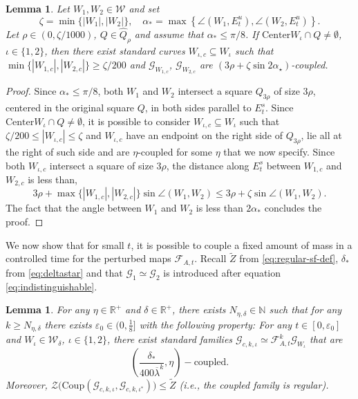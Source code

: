 \documentclass{amsart}
\numberwithin{equation}{section}
\newtheorem{lemma}[theorem]{Lemma}
\newcommand\ve{\varepsilon}
\renewcommand{\ge}{\geqslant}
\renewcommand{\le}{\leqslant}
\newcommand\cF{{\mathcal F}}
\newcommand\cG{{\mathcal G}}
\newcommand\cW{{\mathcal W}}
\newcommand\cZ{{\mathcal Z}}
\newcommand\bN{{\mathbb N}}
\newcommand\bR{{\mathbb R}}
\newcommand{\catt}{\cF_{A,t}}
\newcommand{\Center}{\text{Center}}
\newcommand{\Coup}{\text{Coup}}
\begin{document}
\begin{lemma}\label{lem:int-rect}
  Let \(W_1, W_2 \in \cW\) and set 
\[
\zeta = \min\{|W_1|, |W_2|\}, \quad \alpha_{*} = \max \left\{\angle(W_1, E_t^u), \angle(W_2, E_t^u)\right\}.
\] 
Let \(\rho \in \left(0, \zeta/1000\right)\), \(Q \in \widehat Q_{\rho}\) and assume that \(\alpha_{*} \le \pi/8\). If \(\Center W_{\iota} \cap Q \neq \emptyset\), \(\iota \in \{1,2\}\), then there exist standard curves \(W_{\iota,c} \subseteq W_\iota\) such that \(\min\{|W_{1,c}|, |W_{2,c}|\} \ge \zeta/200\) and \(\cG_{W_{1,c}}\), \(\cG_{W_{2,c}}\) are \(\left(3\rho + \zeta \sin 2 \alpha_{\star}\right)\)-coupled.
\end{lemma}
\begin{proof}
Since \(\alpha_{*} \le \pi/8\), both \(W_1\) and \(W_2\) intersect a square \(Q_{3\rho}\) of size \(3\rho\), centered in the original square \(Q\), in both sides parallel to \(E^s_t\). Since \(\Center W_{\iota} \cap Q \neq \emptyset\), it is possible to consider \(W_{\iota,c} \subseteq W_{\iota}\) such that \(\zeta/200 \le |W_{\iota,c}| \le \zeta\) and \(W_{\iota,c}\) have an endpoint on the right side of \(Q_{3\rho}\), lie all at the right of such side and are \(\eta\)-coupled for some \(\eta\) that we now specify. Since both \(W_{\iota,c}\) intersect a square of size \(3\rho\), the distance along \(E^s_t\) between \(W_{1,c}\) and \(W_{2,c}\) is less than, 
\[
3 \rho + \max\{|W_{1,c}|, |W_{2,c}|\} \sin  \angle (W_1, W_2) \le 3 \rho + \zeta   \sin  \angle (W_1, W_2).
\]
The fact that the angle between \(W_1\) and \(W_2\) is less than \(2\alpha_{*}\) concludes the proof.
\end{proof}
We now show that for small \(t\), it is possible to couple a fixed amount of mass in a controlled time for the perturbed maps \(\catt\). Recall \(\widetilde Z\) from \eqref{eq:regular-sf-def}, \(\delta_{*}\) from \eqref{eq:deltastar} and that \(\cG_1 \simeq \cG_2\) is introduced after equation \eqref{eq:indistinguishable}.
\begin{lemma}\label{lem:first-coupling}
   For any \(\eta \in \bR^+\) and \(\delta \in \bR^+\), there exists \(N_{\eta, \delta}\in \bN\) such that for any \(k \ge N_{\eta,\delta}\) there exists \(\ve_0 \in (0, \frac{1}{8}]\) with the following property: For any \(t \in [0, \ve_0]\) and \(W_{\iota} \in \cW_{\delta}\), \(\iota \in \{1,2\}\), there exist standard families \(\cG_{c,k,\iota} \simeq \catt^{k}\cG_{W_\iota}\) that are
\[
 \left(\frac{\delta_{*}}{400 \overline \lambda^k}, \eta\right)-\text{coupled}.
\]
Moreover, \( \cZ\bigl(\Coup(\cG_{c,k,\iota}, \cG_{c,k,\iota^{*}})\bigr) \le \widetilde Z\) (i.e., the coupled family is regular).
\end{lemma}
\end{document}
